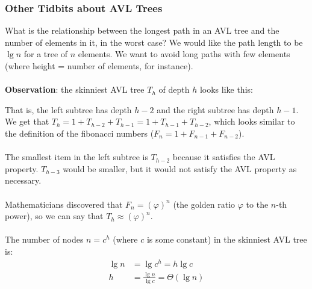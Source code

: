 \documentclass[]{article}
\theoremstyle{definition}
\begin{document}
			\subsubsection{Other Tidbits about AVL Trees}
				What is the relationship between the longest path in an AVL tree and the number of elements in it, in the worst case? We would like the path length to be $\lg n$ for a tree of $n$ elements. We want to avoid long paths with few elements (where height = number of elements, for instance).
				\\ \\
				\textbf{Observation}: the skinniest AVL tree $T_h$ of depth $h$ looks like this:
				\begin{figure}[H]
				\end{figure}
				That is, the left subtree has depth $h - 2$ and the right subtree has depth $h - 1$. We get that $T_h = 1 + T_{h - 2} + T_{h - 1} = 1 + T_{h - 1} + T_{h - 2}$, which looks similar to the definition of the fibonacci numbers ($F_n = 1 + F_{n - 1} + F_{n - 2}$).
				\\ \\
				The smallest item in the left subtree is $T_{h - 2}$ because it satisfies the AVL property. $T_{h - 3}$ would be smaller, but it would not satisfy the AVL property as necessary.
				\\ \\
				Mathematicians discovered that $F_n = (\varphi)^n$ (the golden ratio $\varphi$ to the $n$-th power), so we can say that $T_h \approx (\varphi)^n$.
				\\ \\
				The number of nodes $n = c^h$ (where $c$ is some constant) in the skinniest AVL tree is:
				\begin{align*}
					\lg n &= \lg c^h = h \lg c \\
					h &= \frac{\lg n}{\lg c} = \Theta(\lg n)	
				\end{align*}
\end{document}
